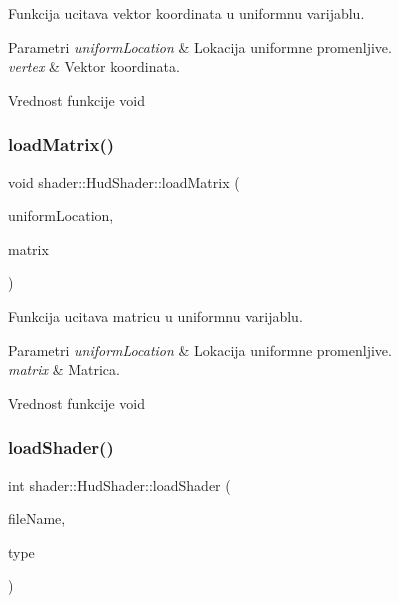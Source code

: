 Funkcija ucitava vektor koordinata u uniformnu varijablu. 


\begin{DoxyParams}{Parametri}
{\em uniform\+Location} & Lokacija uniformne promenljive. \\
\hline
{\em vertex} & Vektor koordinata. \\
\hline
\end{DoxyParams}
\begin{DoxyReturn}{Vrednost funkcije}
void 
\end{DoxyReturn}
\mbox{\label{classshader_1_1HudShader_a373b1c7ffde706843e2b45b7b48af3ef}} 
\subsubsection{\texorpdfstring{load\+Matrix()}{loadMatrix()}}
{\footnotesize\ttfamily void shader\+::\+Hud\+Shader\+::load\+Matrix (\begin{DoxyParamCaption}\item[{int}]{uniform\+Location,  }\item[{mat4}]{matrix }\end{DoxyParamCaption})}



Funkcija ucitava matricu u uniformnu varijablu. 


\begin{DoxyParams}{Parametri}
{\em uniform\+Location} & Lokacija uniformne promenljive. \\
\hline
{\em matrix} & Matrica. \\
\hline
\end{DoxyParams}
\begin{DoxyReturn}{Vrednost funkcije}
void 
\end{DoxyReturn}
\mbox{\label{classshader_1_1HudShader_a585d2f65b6effa66d2f4b68b34f781b4}} 
\subsubsection{\texorpdfstring{load\+Shader()}{loadShader()}}
{\footnotesize\ttfamily int shader\+::\+Hud\+Shader\+::load\+Shader (\begin{DoxyParamCaption}\item[{const char $\ast$}]{file\+Name,  }\item[{G\+Lenum}]{type }\end{DoxyParamCaption})\hspace{0.3cm}{\ttfamily [private]}}



